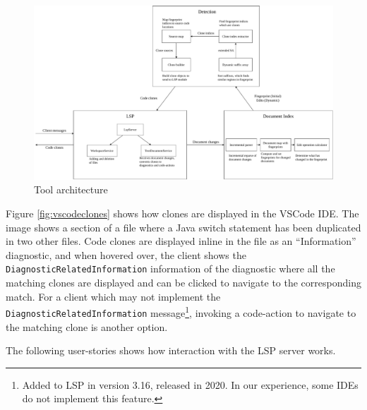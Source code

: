 \begin{figure}[t]
	\includegraphics[width=\textwidth]{figures/architecture.drawio.pdf}
	\caption{Tool architecture}
	\label{fig:architecture}
\end{figure}


Figure \ref{fig:vscodeclones} shows how clones are displayed in the VSCode IDE. The image
shows a section of a file where a Java switch statement has been duplicated in two other
files. Code clones are displayed inline in the file as an ``Information'' diagnostic, and
when hovered over, the client shows the \verb|DiagnosticRelatedInformation| information of
the diagnostic where all the matching clones are displayed and can be clicked to navigate
to the corresponding match. For a client which may not implement the
\verb|DiagnosticRelatedInformation| message\footnote{Added to LSP in version 3.16,
released in 2020. In our experience, some IDEs do not implement this feature.}, invoking a
code-action to navigate to the matching clone is another option.

The following user-stories shows how interaction with the LSP server works.

